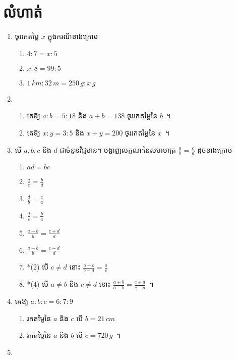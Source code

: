 \documentclass[12pt,a4paper]{pptec}
\begin{document}
    \section{លំហាត់}
    \begin{enumerate}
        \item ចូររកតម្លៃ $ x $ ក្នុងករណីខាងក្រោម
        \begin{enumerate}
            \item $ 4:7=x:5 $
            \item $ x:8=99:5 $
            \item $ 1\, km:32\, m=250\,g :x\, g $
        \end{enumerate}
        \item
        \begin{enumerate}
            \item គេឱ្យ $ a:b=5:18 $ និង $ a+b=138 $ ចូររកតម្លៃនៃ $ b $~។
            \item គេឱ្យ $ x:y=3:5 $ និង $ x+y=200 $ ចូររកតម្លៃនៃ $ x $~។
        \end{enumerate}
        \item បើ $ a,b,c $ និង $ d $ ជាចំនួនវិជ្ជមាន។ បង្ហាញលក្ខណៈនៃសមាមាត្រ $ \frac{a}{b}=\frac{c}{d} $ ដូចខាងក្រោម
        \begin{enumerate}
            \item $ ad=bc $
            \item $ \frac{a}{c}=\frac{b}{d} $
            \item $ \frac{d}{b}=\frac{c}{a} $
            \item $ \frac{d}{c}=\frac{b}{a} $
            \item $ \frac{a+b}{b}=\frac{c+d}{d} $
            \item $ \frac{a-b}{b}=\frac{c-d}{d} $
            \item*(2) បើ $ c\neq d $ នោះ $ \frac{a-b}{c-d}=\frac{a}{c} $
            \item*(4) បើ $ a\neq b $ និង $ c\neq d $ នោះ $ \frac{a+b}{a-b}=\frac{c+d}{c-d} $~។
        \end{enumerate}
        \item គេឱ្យ $ a:b:c=6:7:9 $
        \begin{enumerate}
            \item រកតម្លៃនៃ $ a $ និង $ c $ បើ $ b=21\, cm $
            \item រកតម្លៃនៃ $ a $ និង $ b $ បើ $ c=720\, g $~។
        \end{enumerate}
        \item 

\end{enumerate}
\end{document}

